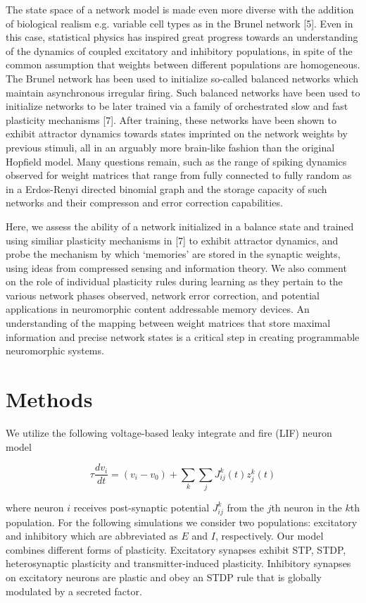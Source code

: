 \documentclass{article} %
\begin{document}
The state space of a network model is made even more diverse with the addition of biological realism e.g. variable cell types as in the Brunel network [5]. Even in this case, statistical physics has inspired great progress towards an understanding of the dynamics of coupled excitatory and inhibitory populations, in spite of the common assumption that weights between different populations are homogeneous. The Brunel network has been used to initialize so-called balanced networks which maintain asynchronous irregular firing. Such balanced networks have been used to initialize networks to be later trained via a family of orchestrated slow and fast plasticity mechanisms [7]. After training, these networks have been shown to exhibit attractor dynamics towards states imprinted on the network weights by previous stimuli, all in an arguably more brain-like fashion than the original Hopfield model. Many questions remain, such as the range of spiking dynamics observed for weight matrices that range from fully connected to fully random as in a Erdos-Renyi directed binomial graph and the storage capacity of such networks and their compresson and error correction capabilities.

Here, we assess the ability of a network initialized in a balance state and trained using similiar plasticity mechanisms in [7] to exhibit attractor dynamics, and probe the mechanism by which `memories' are stored in the synaptic weights, using ideas from compressed sensing and information theory. We also comment on the role of individual plasticity rules during learning as they pertain to the various network phases observed, network error correction, and potential applications in neuromorphic content addressable memory devices. An understanding of the mapping between weight matrices that store maximal information and precise network states is a critical step in creating programmable neuromorphic systems.

\section{Methods}

We utilize the following voltage-based leaky integrate and fire (LIF) neuron model

\begin{equation}
\tau\frac{dv_{i}}{dt} = (v_{i} - v_{0}) + \sum_{k}\sum_{j}J_{ij}^{k}(t)z_{j}^{k}(t)
\end{equation}

where neuron $i$ receives post-synaptic potential $J_{ij}^{k}$ from the $j$th neuron in the $k$th population. For the following simulations we consider two populations: excitatory and inhibitory which are abbreviated as $E$ and $I$, respectively. Our model combines different forms of plasticity. Excitatory synapses exhibit STP, STDP, heterosynaptic plasticity and transmitter-induced plasticity. Inhibitory synapses on excitatory neurons are plastic and obey an STDP rule that is globally modulated by a secreted factor.
\end{document}
